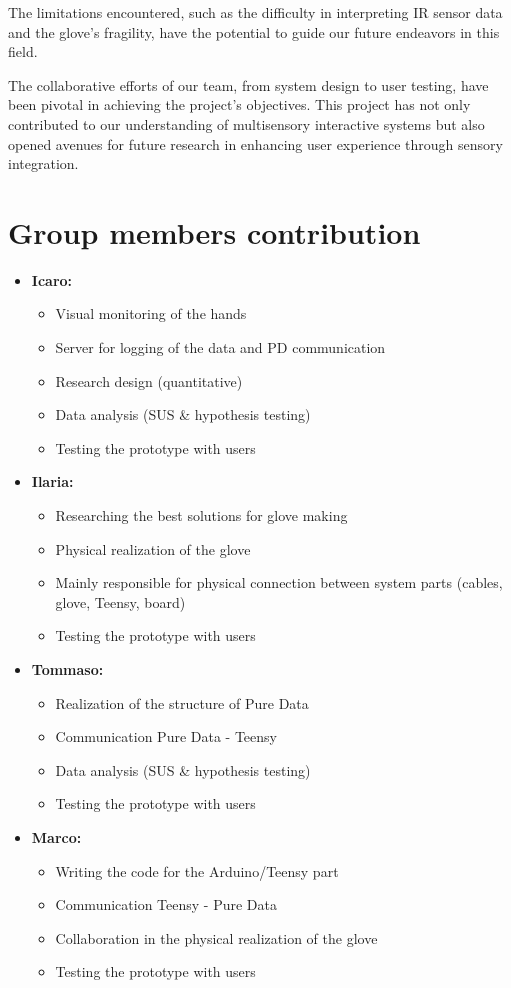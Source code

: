 \documentclass[11pt,a4paper]{report}
\begin{document}
\noindent The limitations encountered, such as the difficulty in interpreting IR sensor data and the glove's fragility, have the potential to guide our future endeavors in this field.

\noindent The collaborative efforts of our team, from system design to user testing, have been pivotal in achieving the project's objectives. This project has not only contributed to our understanding of multisensory interactive systems but also opened avenues for future research in enhancing user experience through sensory integration.


\section*{Group members contribution}
\begin{itemize}
\item \textbf{Icaro:}
  \begin{itemize}[noitemsep]
  \item Visual monitoring of the hands
  \item Server for logging of the data and PD communication
  \item Research design (quantitative)
  \item Data analysis (SUS \& hypothesis testing)
  \item Testing the prototype with users
  \end{itemize}

\item \textbf{Ilaria:}
  \begin{itemize}[noitemsep]
  \item Researching the best solutions for glove making
  \item Physical realization of the glove
  \item Mainly responsible for physical connection between system parts (cables, glove, Teensy, board)
  \item Testing the prototype with users
  \end{itemize}

\item \textbf{Tommaso:}
  \begin{itemize}[noitemsep]
  \item Realization of the structure of Pure Data
  \item Communication Pure Data - Teensy
  \item Data analysis (SUS \& hypothesis testing)
  \item Testing the prototype with users
  \end{itemize}

\item \textbf{Marco:}
  \begin{itemize}[noitemsep]
  \item Writing the code for the Arduino/Teensy part
  \item Communication Teensy - Pure Data
  \item Collaboration in the physical realization of the glove
  \item Testing the prototype with users
  \end{itemize}
\end{itemize}
\end{document}
